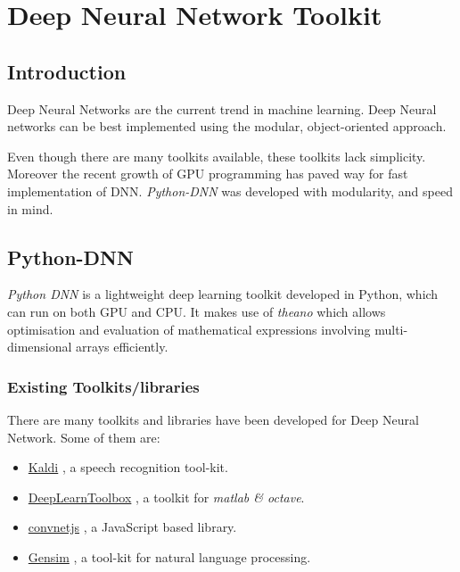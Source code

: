 \chapter{Deep Neural Network Toolkit} 
\label{chap:toolkit}
\section{Introduction}
Deep Neural Networks are the current trend in machine learning. Deep Neural networks can be best implemented using the modular, object-oriented approach. 

Even though there are many toolkits available, these toolkits lack simplicity. Moreover the recent growth of GPU programming has paved way for fast implementation of DNN. \textit{Python-DNN} was developed with modularity, and speed in mind.

\section{Python-DNN}
\textit{Python DNN} is a lightweight deep learning toolkit developed in Python, which can run on both GPU and CPU. It makes use of \emph{theano}  \cite{bergstra2010theano} which allows optimisation and evaluation of mathematical expressions involving multi-dimensional arrays efficiently.

\subsection{Existing Toolkits/libraries}
There are many toolkits and libraries have been developed for Deep Neural Network. Some of them are: 
\begin{itemize}
\item \href{http://kaldi.sourceforge.net/}{Kaldi} \citep{Povey_ASRU2011}, a speech recognition tool-kit.
\item \href{https://github.com/rasmusbergpalm/DeepLearnToolbox}{DeepLearnToolbox} \citep{IMM2012-06284}, a toolkit for \textit{matlab \& octave}.
\item \href{http://cs.stanford.edu/people/karpathy/convnetjs/}{convnetjs} \citep{convnetjs} , a JavaScript based library.
\item \href{https://radimrehurek.com/gensim}{Gensim} \citep{rehurek_lrec}, a tool-kit for natural language processing.
\end{itemize}

